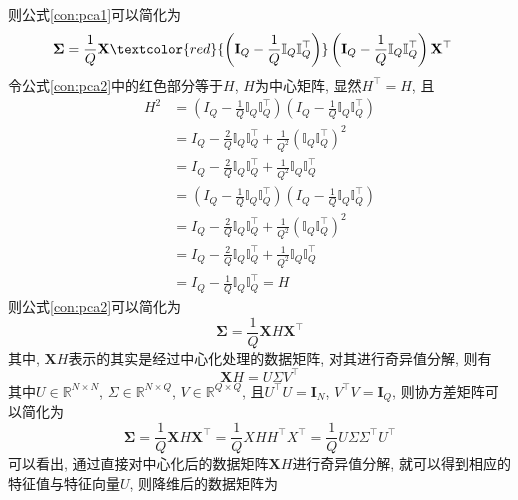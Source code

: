 \documentclass[lang=cn,10pt]{gorgeousnbook}
\numberwithin{equation}{section}%
\numberwithin{figure}{section}%
\begin{document}
则公式\eqref{con:pca1}可以简化为
\begin{equation}
\begin{aligned}
\mathbf{\Sigma}&=\frac{1}{Q}\mathbf{X}\textcolor{red}{\left( \mathbf{I}_Q-\frac{1}{Q}\mathbb{I}_Q\mathbb{I}_{Q}^{\top} \right)} \left( \mathbf{I}_Q-\frac{1}{Q}\mathbb{I}_Q\mathbb{I}_{Q}^{\top} \right) \mathbf{X}^{\top} \label{con:pca2}
\end{aligned}
\end{equation}
令公式\eqref{con:pca2}中的红色部分等于$H$, $H$为中心矩阵, 显然$H^{\top}=H$, 且
\begin{equation}
\begin{aligned}
H^2&=\left( I_Q-\frac{1}{Q}\mathbb{I}_Q\mathbb{I}_{Q}^{\top} \right) \left( I_Q-\frac{1}{Q}\mathbb{I}_Q\mathbb{I}_{Q}^{\top} \right) \\
&=I_Q-\frac{2}{Q}\mathbb{I}_Q\mathbb{I}_{Q}^{\top}+\frac{1}{Q^2}\left( \mathbb{I}_Q\mathbb{I}_{Q}^{\top} \right) ^2\\
&=I_Q-\frac{2}{Q}\mathbb{I}_Q\mathbb{I}_{Q}^{\top}+\frac{1}{Q^2}\mathbb{I}_Q\mathbb{I}_{Q}^{\top}\\
&=\left( I_Q-\frac{1}{Q}\mathbb{I}_Q\mathbb{I}_{Q}^{\top} \right) \left( I_Q-\frac{1}{Q}\mathbb{I}_Q\mathbb{I}_{Q}^{\top} \right) \\
&=I_Q-\frac{2}{Q}\mathbb{I}_Q\mathbb{I}_{Q}^{\top}+\frac{1}{Q^2}\left( \mathbb{I}_Q\mathbb{I}_{Q}^{\top} \right) ^2 \\
&=I_Q-\frac{2}{Q}\mathbb{I}_Q\mathbb{I}_{Q}^{\top}+\frac{1}{Q^2}\mathbb{I}_Q\mathbb{I}_{Q}^{\top}\\
&=I_Q-\frac{1}{Q}\mathbb{I}_Q\mathbb{I}_{Q}^{\top}=H
\end{aligned}
\end{equation}
则公式\eqref{con:pca2}可以简化为
\begin{equation}
\mathbf{\Sigma} = \frac{1}{Q}\mathbf{X}H\mathbf{X}^{\top}
\end{equation}
其中, $\mathbf{X}H$表示的其实是经过中心化处理的数据矩阵, 对其进行奇异值分解, 则有
\begin{equation}
\mathbf{X}H=U\Sigma V^{\top}
\end{equation}
其中$U\in \mathbb{R}^{N\times N}$, $\Sigma \in \mathbb{R}^{N\times Q}$, $V\in \mathbb{R}^{Q\times Q}$, 且$U^{\top}U=\mathbf{I}_N$, $V^{\top}V=\mathbf{I}_Q$, 则协方差矩阵可以简化为
\begin{equation}
\mathbf{\Sigma }=\frac{1}{Q}\mathbf{X}H\mathbf{X}^{\top}=\frac{1}{Q}XHH^{\top}X^{\top}=\frac{1}{Q}U\varSigma \varSigma ^{\top}U^{\top}
\end{equation}
可以看出, 通过直接对中心化后的数据矩阵$\mathbf{X}H$进行奇异值分解, 就可以得到相应的特征值与特征向量$U$, 则降维后的数据矩阵为
\end{document}
